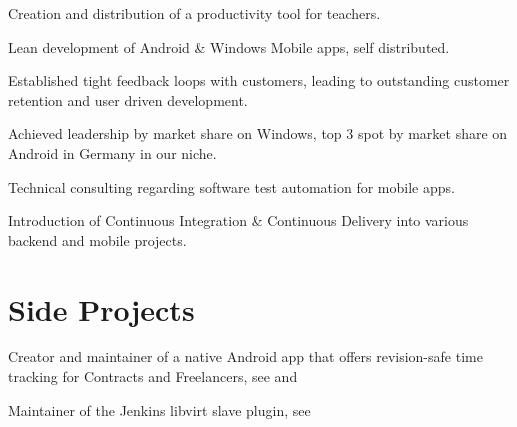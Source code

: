 \documentclass[]{resume}
\begin{document}
\begin{minipage}[t]{0.64\textwidth}
\begin{tightemize}
\item Creation and distribution of a productivity tool for teachers.
\item Lean development of Android \& Windows Mobile apps, self distributed.
\item Established tight feedback loops with customers, leading to outstanding customer retention and user driven development.
\item Achieved leadership by market share on Windows, top 3 spot by market share on Android in Germany in our niche.
\end{tightemize}
\sectionsep

\begin{tightemize}
\item Technical consulting regarding software test automation for mobile apps.
\item Introduction of Continuous Integration \& Continuous Delivery into various backend and mobile projects.
\end{tightemize}
\sectionsep



\section{Side Projects}

Creator and maintainer of a native Android app that offers revision-safe time tracking for Contracts and Freelancers, see \href{https://github.com/tastybug/timetracker}{} and \href{https://play.google.com/store/apps/details?id=com.tastybug.timetracker}{}
\sectionsep

Maintainer of the Jenkins libvirt slave plugin, see \href{https://wiki.jenkins.io/display/JENKINS/Libvirt+Slaves+Plugin}{}
\sectionsep

\end{minipage}
\end{document}
